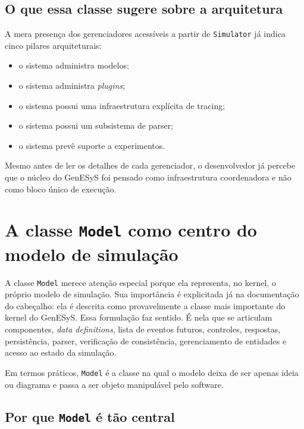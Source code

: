 \subsection{O que essa classe sugere sobre a arquitetura}
\label{subsec:cap7_o_que_simulator_sugere}

A mera presença dos gerenciadores acessíveis a partir de \texttt{Simulator} já indica cinco pilares arquiteturais:
\begin{itemize}
    \item o sistema administra modelos;
    \item o sistema administra \textit{plugins};
    \item o sistema possui uma infraestrutura explícita de tracing;
    \item o sistema possui um subsistema de parser;
    \item o sistema prevê suporte a experimentos.
\end{itemize}

Mesmo antes de ler os detalhes de cada gerenciador, o desenvolvedor já percebe que o núcleo do GenESyS foi pensado como infraestrutura coordenadora e não como bloco único de execução.

\section{A classe \texttt{Model} como centro do modelo de simulação}
\label{sec:cap7_classe_model}

A classe \texttt{Model} merece atenção especial porque ela representa, no kernel, o próprio modelo de simulação. Sua importância é explicitada já na documentação do cabeçalho: ela é descrita como provavelmente a classe mais importante do kernel do GenESyS. Essa formulação faz sentido. É nela que se articulam componentes, \textit{data definitions}, lista de eventos futuros, controles, respostas, persistência, parser, verificação de consistência, gerenciamento de entidades e acesso ao estado da simulação.

Em termos práticos, \texttt{Model} é a classe na qual o modelo deixa de ser apenas ideia ou diagrama e passa a ser objeto manipulável pelo software.

\subsection{Por que \texttt{Model} é tão central}
\label{subsec:cap7_por_que_model_central}

